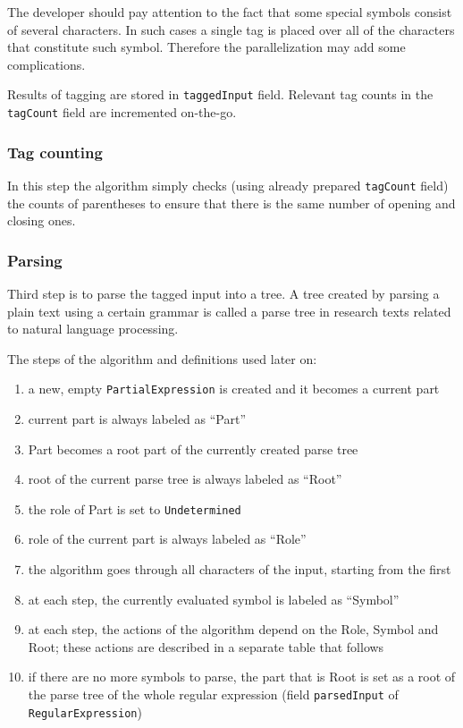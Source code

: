 \documentclass{article}
\begin{document}
The developer should pay attention to the fact that some special symbols consist of several
characters. In such cases a single tag is placed over all of the characters that constitute such
symbol. Therefore the parallelization may add some complications.

Results of tagging are stored in \verb|taggedInput| field. Relevant tag counts in the
\verb|tagCount| field are incremented on-the-go.

\subsubsection{Tag counting}
In this step the algorithm simply checks (using already prepared \verb|tagCount| field) the counts
of parentheses to ensure that there is the same number of opening and closing ones.

\subsubsection{Parsing}
Third step is to parse the tagged input into a tree. A tree created by parsing a plain text using a
certain grammar is called a parse tree in research texts related to natural language processing.

The steps of the algorithm and definitions used later on:
\begin{enumerate}

  \item a new, empty \verb|PartialExpression| is created and it becomes a current part

  \item current part is always labeled as ``Part''

  \item Part becomes a root part of the currently created parse tree

  \item root of the current parse tree is always labeled as ``Root''

  \item the role of Part is set to \verb|Undetermined|

  \item role of the current part is always labeled as ``Role''

  \item the algorithm goes through all characters of the input, starting from the first

  \item at each step, the currently evaluated symbol is labeled as ``Symbol''

  \item at each step, the actions of the algorithm depend on the Role, Symbol and Root; these
  actions are described in a separate table that follows

  \item if there are no more symbols to parse, the part that is Root is set as a root of the parse
  tree of the whole regular expression (field \verb|parsedInput| of \verb|RegularExpression|)

\end{enumerate}
\end{document}
